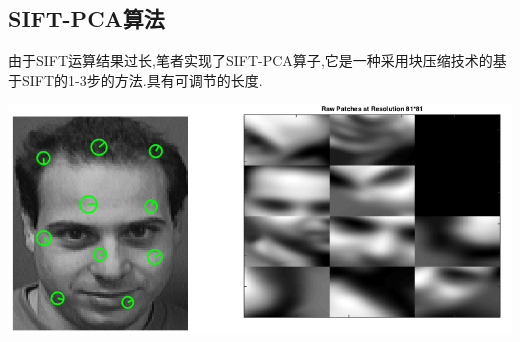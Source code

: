 \subsection{SIFT-PCA算法}
由于SIFT运算结果过长,笔者实现了SIFT-PCA算子\cite{ke2004pca},它是一种采用块压缩技术的基于SIFT的1-3步的方法.具有可调节的长度.

	 	\begin{center}
		\begin{minipage}[t]{\linewidth}
		\center
		{
		\includegraphics[width=\MyFactor\textwidth]{Img/c3/sift_raw_patch2} 
		\captionsetup{justification=centering}
				\label{fig:sift_patches}
		}
		\end{minipage}
		\medskip
		\end{center}
	
